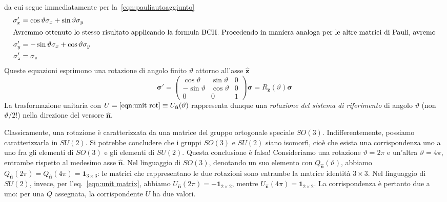 da cui segue immediatamente per la~\eqref{eqn:pauliautoaggiunto}
\begin{subequations}
\begin{align}
\sigma'_x&=\cos{\vartheta}\sigma_x+\sin{\vartheta}\sigma_y \\
\intertext{Avremmo ottenuto lo stesso risultato applicando la formula BCH. Procedendo in maniera analoga per le altre matrici di Pauli, avremo}
\sigma'_y&=-\sin{\vartheta}\sigma_x+\cos{\vartheta}\sigma_y \\
\sigma'_z&=\sigma_z
\end{align}
\end{subequations}
Queste equazioni esprimono una rotazione di angolo finito $\vartheta$ attorno all'asse $\hat{\textbf{z}}$
\begin{equation}
\boldsymbol\sigma'=
\begin{pmatrix}
\cos{\vartheta} & \sin{\vartheta} & 0 \\
-\sin{\vartheta} & \cos{\vartheta} & 0 \\
0 & 0 & 1
\end{pmatrix}
\boldsymbol\sigma=R_{\hat{\textbf{z}}}(\vartheta)\boldsymbol\sigma
\end{equation}
La trasformazione unitaria con $U=\eqref{eqn:unit rot}\equiv U_{\hat{\textbf{n}}}(\vartheta)$ rappresenta dunque una \textit{rotazione del sistema di riferimento} di angolo $\vartheta$ (non $\vartheta/2$!) nella direzione del versore $\hat{\textbf{n}}$.

Classicamente, una rotazione è caratterizzata da una matrice del gruppo ortogonale speciale $SO(3)$. Indifferentemente, possiamo caratterizzarla in $SU(2)$. Si potrebbe concludere che i gruppi $SO(3)$ e $SU(2)$ siano isomorfi, cioè che esista una corrispondenza uno a uno fra gli elementi di $SO(3)$ e gli elementi di $SU(2)$. Questa conclusione è falsa! Consideriamo una rotazione $\vartheta=2\pi$ e un'altra $\vartheta=4\pi$, entrambe rispetto al medesimo asse $\hat{\textbf{n}}$. Nel linguaggio di $SO(3)$, denotando un suo elemento con $Q_{\hat{\textbf{n}}}(\vartheta)$, abbiamo $Q_{\hat{\textbf{n}}}(2\pi)=Q_{\hat{\textbf{n}}}(4\pi)=\textbf{1}_{3\times3}$: le matrici che rappresentano le due rotazioni sono entrambe la matrice identità $3\times 3$. Nel linguaggio di $SU(2)$, invece, per l'eq.~\eqref{eqn:unit matrix}, abbiamo $U_{\hat{\textbf{n}}}(2\pi)=-\textbf{1}_{2\times2}$, mentre $U_{\hat{\textbf{n}}}(4\pi)=\textbf{1}_{2\times2}$. La corrispondenza è pertanto due a uno: per una $Q$ assegnata, la corrispondente $U$ ha due valori.

